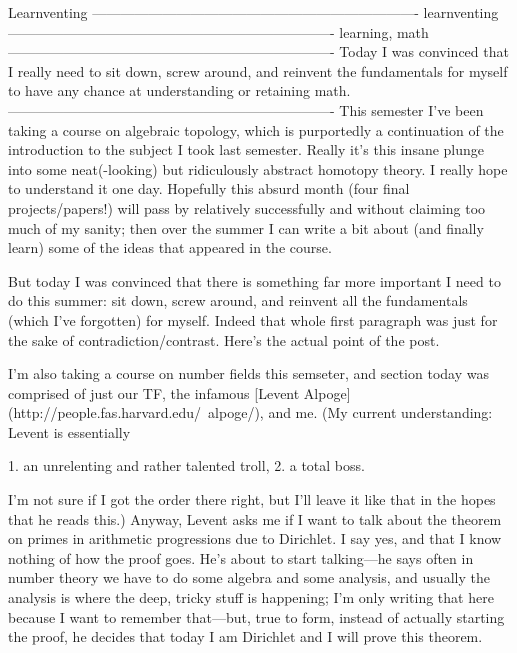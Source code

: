 Learnventing
----------------------------------------------------------------------
learnventing
----------------------------------------------------------------------
learning, math
----------------------------------------------------------------------
Today I was convinced that I really need to sit down, screw around,
and reinvent the fundamentals for myself to have any chance at
understanding or retaining math.
----------------------------------------------------------------------
This semester I've been taking a course on algebraic topology, which
is purportedly a continuation of the introduction to the subject I
took last semester. Really it's this insane plunge into some
neat(-looking) but ridiculously abstract homotopy theory. I really
hope to understand it one day. Hopefully this absurd month (four final
projects/papers!) will pass by relatively successfully and without
claiming too much of my sanity; then over the summer I can write a bit
about (and finally learn) some of the ideas that appeared in the
course. 

But today I was convinced that there is something far more important I
need to do this summer: sit down, screw around, and reinvent all the
fundamentals (which I've forgotten) for myself. Indeed that whole
first paragraph was just for the sake of
contradiction/contrast. Here's the actual point of the post.

I'm also taking a course on number fields this semseter, and section
today was comprised of just our TF, the infamous [Levent Alpoge](http://people.fas.harvard.edu/~alpoge/), and
me. (My current understanding: Levent is essentially

1. an unrelenting and rather talented troll,
2. a total boss.

I'm not sure if I got the order there right, but I'll leave it like
that in the hopes that he reads this.) Anyway, Levent asks me if I
want to talk about the theorem on primes in arithmetic progressions
due to Dirichlet. I say yes, and that I know nothing of how the proof
goes. He's about to start talking---he says often in number theory we
have to do some algebra and some analysis, and usually the analysis is
where the deep, tricky stuff is happening; I'm only writing that here
because I want to remember that---but, true to form, instead
of actually starting the proof, he decides that today I am Dirichlet
and I will prove this theorem. 

